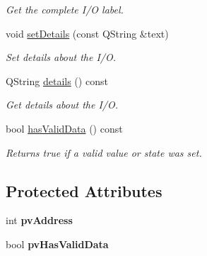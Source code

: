 \begin{DoxyCompactItemize}
\begin{DoxyCompactList}\small\item\em Get the complete I/O label. \end{DoxyCompactList}\item 
\hypertarget{classmdt_abstract_io_a9844c14b0e64858c62604039681ab885}{
void \hyperlink{classmdt_abstract_io_a9844c14b0e64858c62604039681ab885}{setDetails} (const QString \&text)}
\label{classmdt_abstract_io_a9844c14b0e64858c62604039681ab885}

\begin{DoxyCompactList}\small\item\em Set details about the I/O. \end{DoxyCompactList}\item 
\hypertarget{classmdt_abstract_io_a6e0b36f1563a045a23417145290fdf41}{
QString \hyperlink{classmdt_abstract_io_a6e0b36f1563a045a23417145290fdf41}{details} () const }
\label{classmdt_abstract_io_a6e0b36f1563a045a23417145290fdf41}

\begin{DoxyCompactList}\small\item\em Get details about the I/O. \end{DoxyCompactList}\item 
\hypertarget{classmdt_abstract_io_a61d96045087fe92a0b455693970b1e76}{
bool \hyperlink{classmdt_abstract_io_a61d96045087fe92a0b455693970b1e76}{hasValidData} () const }
\label{classmdt_abstract_io_a61d96045087fe92a0b455693970b1e76}

\begin{DoxyCompactList}\small\item\em Returns true if a valid value or state was set. \end{DoxyCompactList}\end{DoxyCompactItemize}
\subsection*{Protected Attributes}
\begin{DoxyCompactItemize}
\item 
\hypertarget{classmdt_abstract_io_a45f50dbd2bafc248428e59f2c4c6272b}{
int {\bfseries pvAddress}}
\label{classmdt_abstract_io_a45f50dbd2bafc248428e59f2c4c6272b}

\item 
\hypertarget{classmdt_abstract_io_ac7d552a8474559cac50488bd14891ce3}{
bool {\bfseries pvHasValidData}}
\label{classmdt_abstract_io_ac7d552a8474559cac50488bd14891ce3}

\end{DoxyCompactItemize}


